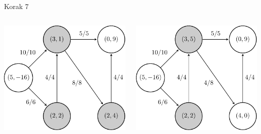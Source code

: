 \documentclass{beamer}
\begin{document}
\begin{frame}{Korak 7}
    \begin{columns}
        \begin{column}{0.5\textwidth}
            \centering
            \includegraphics[scale=0.7]{../writing/images/graf2-8.pdf}
        \end{column}
        \pause
        \begin{column}{0.5\textwidth}
            \centering
            \includegraphics[scale=0.7]{../writing/images/graf2-9.pdf}
        \end{column}
    \end{columns}
\end{frame}
\end{document}
